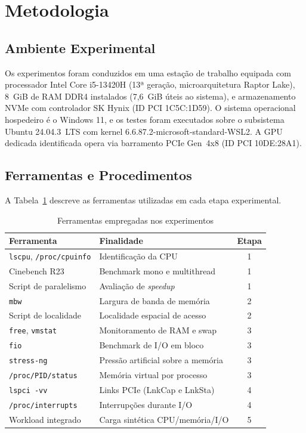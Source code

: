 \documentclass[12pt]{article}
\begin{document}
\section{Metodologia}
\label{sec:met}

\subsection{Ambiente Experimental}

Os experimentos foram conduzidos em uma estação de trabalho equipada com processador Intel Core i5-13420H (13ª geração, microarquitetura Raptor Lake), 8~GiB de RAM DDR4 instalados (7,6~GiB úteis ao sistema), e armazenamento NVMe com controlador SK Hynix (ID PCI 1C5C:1D59). O sistema operacional hospedeiro é o Windows 11, e os testes foram executados sobre o subsistema Ubuntu 24.04.3~LTS com kernel 6.6.87.2-microsoft-standard-WSL2. A GPU dedicada identificada opera via barramento PCIe Gen~4x8 (ID PCI 10DE:28A1).

\subsection{Ferramentas e Procedimentos}

A Tabela~\ref{tab:ferramentas} descreve as ferramentas utilizadas em cada etapa experimental.

\begin{table}[H]
\centering
\caption{Ferramentas empregadas nos experimentos}
\label{tab:ferramentas}
\begin{tabular}{p{4.2cm}p{6.5cm}c}
\hline
\textbf{Ferramenta} & \textbf{Finalidade} & \textbf{Etapa} \\
\hline
\texttt{lscpu}, \texttt{/proc/cpuinfo} & Identificação da CPU & 1 \\
Cinebench R23 & Benchmark mono e multithread & 1 \\
Script de paralelismo & Avaliação de \textit{speedup} & 1 \\
\texttt{mbw} & Largura de banda de memória & 2 \\
Script de localidade & Localidade espacial de acesso & 2 \\
\texttt{free}, \texttt{vmstat} & Monitoramento de RAM e swap & 3 \\
\texttt{fio} & Benchmark de I/O em bloco & 3 \\
\texttt{stress-ng} & Pressão artificial sobre a memória & 3 \\
\texttt{/proc/PID/status} & Memória virtual por processo & 3 \\
\texttt{lspci -vv} & Links PCIe (LnkCap e LnkSta) & 4 \\
\texttt{/proc/interrupts} & Interrupções durante I/O & 4 \\
Workload integrado & Carga sintética CPU/memória/I/O & 5 \\
\hline
\end{tabular}
\end{table}
\end{document}
